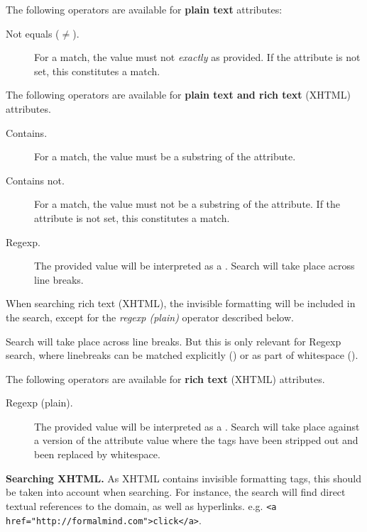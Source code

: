 The following operators are available for \textbf{plain text} attributes:

\begin{description}
\item[Not equals ($\neq$).] For a match, the value must not \textit{exactly} as provided.  If the attribute is not set, this constitutes a match.
\end{description}

The following operators are available for \textbf{plain text and rich text} (XHTML) attributes.

\begin{description}
\item[Contains.] For a match, the value must be a substring of the attribute.
\item[Contains not.] For a match, the value must not be a substring of the attribute. If the attribute is not set, this constitutes a match.
\item[Regexp.] The provided value will be interpreted as a .  Search will take place across line breaks.
\end{description}

\begin{info}
When searching rich text (XHTML), the invisible formatting will be included in the search, except for the \textit{regexp (plain)} operator described below.

Search will take place across line breaks.  But this is only relevant for Regexp search, where linebreaks can be matched explicitly () or as part of whitespace ().
\end{info}

The following operators are available for \textbf{rich text} (XHTML) attributes.

\begin{description}
\item[Regexp (plain).] The provided value will be interpreted as a .  Search will take place against a version of the attribute value where the tags have been stripped out and been replaced by whitespace.
\end{description}

\begin{example}
\textbf{Searching XHTML.}  As XHTML contains invisible formatting tags, this should be taken into account when searching.  For instance, the search   will find direct textual references to the domain, as well as hyperlinks. e.g. \texttt{<a href="http://for\-malmind.com">click</a>}.
\end{example}

